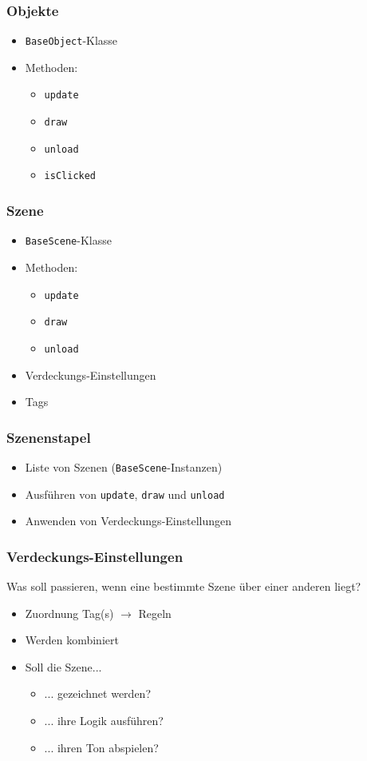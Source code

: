 \begin{frame}
	\frametitle{Objekte}
	\begin{itemize}
		\item \texttt{BaseObject}-Klasse
		\item Methoden:
		\begin{itemize}
			\item \texttt{update}
			\item \texttt{draw}
			\item \texttt{unload}
			\item \texttt{isClicked}
		\end{itemize}
	\end{itemize}
\end{frame}

\begin{frame}
	\frametitle{Szene}
	\begin{itemize}
		\item \texttt{BaseScene}-Klasse
		\item Methoden:
		\begin{itemize}
			\item \texttt{update}
			\item \texttt{draw}
			\item \texttt{unload}
		\end{itemize}
		\item Verdeckungs-Einstellungen
		\item Tags
	\end{itemize}
\end{frame}

\begin{frame}
	\frametitle{Szenenstapel}
	\begin{itemize}
		\item Liste von Szenen (\texttt{BaseScene}-Instanzen)
		\item Ausführen von \texttt{update}, \texttt{draw} und \texttt{unload}
		\item Anwenden von Verdeckungs-Einstellungen
	\end{itemize}
\end{frame}

\begin{frame}
	\frametitle{Verdeckungs-Einstellungen}
	Was soll passieren, wenn eine bestimmte Szene über einer anderen liegt?
	\vspace{0.3cm}
	
	\begin{itemize}
		\item Zuordnung Tag(s) $\rightarrow$ Regeln
		\item Werden kombiniert
		\item Soll die Szene...
		\begin{itemize}
			\item[] ... gezeichnet werden?
			\item[] ... ihre Logik ausführen?
			\item[] ... ihren Ton abspielen?
		\end{itemize}
	\end{itemize}
\end{frame}

